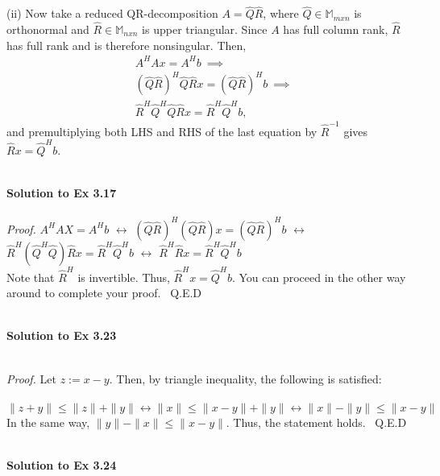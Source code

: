 \documentclass[letterpaper,12pt]{article}
\theoremstyle{definition}
\begin{document}
\begin{spacing}{1.3}{}
	(ii)
	Now take a reduced QR-decomposition $A=\hat{Q}\hat{R}$,
	where $\hat{Q}\in\mathbb M_{mxn}$ is orthonormal and $\hat{R}\in\mathbb M_{nxn}$ is upper triangular.
	Since $A$ has full column rank, $\hat{R}$ has full rank and is therefore nonsingular.
	Then,
	\begin{align*}
	&A^HAx=A^Hb\ \implies\\
	&(\hat{Q}\hat{R})^H\hat{Q}\hat{R}x = (\hat{Q}\hat{R})^Hb\ \implies\\
	&\hat{R}^H\hat{Q}^H\hat{Q}\hat{R}x = \hat{R}^H\hat{Q}^Hb,
	\end{align*}
	and premultiplying both LHS and RHS of the last equation by $\hat{R}^{-1}$ gives
	$\hat{R}x = \hat{Q}^Hb$. \\\\
	
	\setlength{\leftskip}{10pt}
	
	\textbf{Solution to Ex 3.17} \\\\
	
	\setlength{\leftskip}{10pt}
	\emph{Proof.} $A^{H}AX = A^{H}b$ $\leftrightarrow$ $(\hat{Q} \hat{R})^{H} (\hat{Q} \hat{R}) x = (\hat{Q} \hat{R})^{H} b $ $\leftrightarrow$ $\hat{R}^{H} (\hat{Q}^{H} \hat{Q}) \hat{R} x = \hat{R}^{H} \hat{Q}^{H} b$ $\leftrightarrow$ $\hat{R}^{H} \hat{R} x = \hat{R}^{H} \hat{Q}^{H}b $ \\
	Note that $\hat{R}^{H}$ is invertible. Thus, $\hat{R}^{H} x = \hat{Q}^{H} b$. You can proceed in the other way around to complete your proof. \ Q.E.D \\\\
	
	\setlength{\leftskip}{10pt}
	
	\textbf{Solution to Ex 3.23} \\\\
	
	\setlength{\leftskip}{20pt}
	
	\emph{Proof.} Let $z := x-y$. Then, by triangle inequality, the following is satisfied: \\\\
	\[\|z+y\| \leq \|z\| + \|y\| \leftrightarrow \|x\| \leq \|x-y\| + \|y\| \leftrightarrow \|x\| - \|y\| \leq \|x-y\| \]
	In the same way, $\|y\| - \|x\| \leq \|x-y\|$. Thus, the statement holds. \ Q.E.D \\\\
	
	\setlength{\leftskip}{10pt}
	
	\textbf{Solution to Ex 3.24} \\\\
	

\end{spacing}
\end{document}
